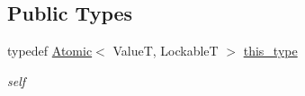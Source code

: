 \subsection*{Public Types}
\begin{DoxyCompactItemize}
\item 
\hypertarget{classhryky_1_1exclusion_1_1_atomic_ad9cd74bf1ea868347402716d7ce72fd7}{typedef \hyperlink{classhryky_1_1exclusion_1_1_atomic}{Atomic}$<$ Value\-T, Lockable\-T $>$ \hyperlink{classhryky_1_1exclusion_1_1_atomic_ad9cd74bf1ea868347402716d7ce72fd7}{this\-\_\-type}}\label{classhryky_1_1exclusion_1_1_atomic_ad9cd74bf1ea868347402716d7ce72fd7}

\begin{DoxyCompactList}\small\item\em self \end{DoxyCompactList}\end{DoxyCompactItemize}
